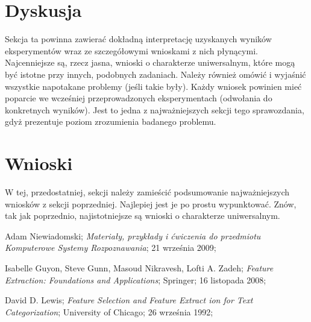 \documentclass{classrep}
\begin{document}
\section{Dyskusja}
{\color{blue}
Sekcja ta powinna zawierać dokładną interpretację uzyskanych wyników
eksperymentów wraz ze szczegółowymi wnioskami z nich płynącymi. Najcenniejsze
są, rzecz jasna, wnioski o charakterze uniwersalnym, które mogą być istotne
przy innych, podobnych zadaniach. Należy również omówić i wyjaśnić wszystkie
napotakane problemy (jeśli takie były). Każdy wniosek powinien mieć poparcie
we wcześniej przeprowadzonych eksperymentach (odwołania do konkretnych
wyników). Jest to jedna z najważniejszych sekcji tego sprawozdania, gdyż
prezentuje poziom zrozumienia badanego problemu.}
\section{Wnioski}
{\color{blue}W tej, przedostatniej, sekcji należy zamieścić podsumowanie
najważniejszych wniosków z sekcji poprzedniej. Najlepiej jest je po prostu
wypunktować. Znów, tak jak poprzednio, najistotniejsze są wnioski o
charakterze uniwersalnym.}


\begin{thebibliography}{0}

 Adam Niewiadomski;
\textsl{Materiały, przykłady i ćwiczenia do przedmiotu
Komputerowe Systemy Rozpoznawania}; 21 września 2009;

 Isabelle Guyon, Steve Gunn, Masoud Nikravesh, Lofti A. Zadeh;
\textsl{Feature Extraction: Foundations and Applications}; Springer; 16 listopada 2008;

 David D. Lewis;
\textsl{Feature Selection and Feature Extract ion for Text Categorization}; University of Chicago; 26 września 1992;


\end{thebibliography}
\end{document}
